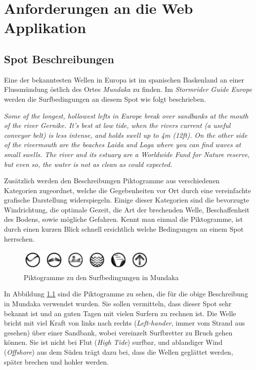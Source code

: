 
\chapter{Anforderungen an die Web Applikation}

\section{Spot Beschreibungen}

Eine der bekanntesten Wellen in Europa ist im spanischen Baskenland an
einer Fluss\-mündung östlich des Ortes \textit{Mundaka} zu finden. Im
\textit{Stormrider Guide Europe} \cite[S.180]{storm_europe_1998}
werden die Surfbedingungen an diesem Spot wie folgt beschrieben.

\textit{Some of the longest, hollowest lefts in Europe break over
  sandbanks at the mouth of the river Gernike. It's best at low tide,
  when the rivers current (a useful conveyor belt) is less intense,
  and holds swell up to 4m (12ft). On the other side of the rivermouth
  are the beaches Laida and Laga where you can find waves at small
  swells. The river and its estuary are a Worldwide Fund for Nature
  reserve, but even so, the water is not as clean as could expected.
}

Zusätzlich werden den Beschreibungen Piktogramme aus verschiedenen
Kategorien zugeordnet, welche die Gegebenheiten vor Ort durch eine
vereinfachte grafische Darstellung widerspiegeln. Einige dieser
Kategorien sind die bevorzugte Windrichtung, die optimale Gezeit, die
Art der brechenden Welle, Beschaffenheit des Bodens, sowie mögliche
Gefahren. Kennt man einmal die Piktogramme, ist durch einen kurzen
Blick schnell ersichtlich welche Bedingungen an einem Spot herrschen.

\begin{figure}[h]
  \begin{center}
    \includegraphics[height=40px]{bilder/mundaka-conditions}
    \caption{Piktogramme zu den Surfbedingungen in Mundaka}
    \label{piktogramm}
  \end{center}
\end{figure}

In Abbildung \ref{piktogramm} sind die Piktogramme zu sehen, die für
die obige Beschreibung in Mundaka verwendet wurden. Sie sollen
vermitteln, dass dieser Spot sehr bekannt ist und an guten Tagen mit
vielen Surfern zu rechnen ist. Die Welle bricht mit viel Kraft von
links nach rechts (\textit{Left-hander}, immer vom Strand aus gesehen)
über einer Sandbank, wobei vereinzelt Surfbretter zu Bruch gehen
können.  Sie ist nicht bei Flut (\textit{High Tide}) surfbar, und
ablandiger Wind (\textit{Offshore}) aus dem Süden trägt dazu bei, dass
die Wellen geglättet werden, später brechen und hohler werden.


